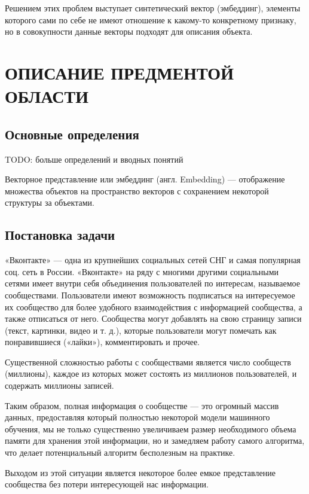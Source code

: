 \documentclass[times,specification,annotation]{itmo-student-thesis}
\begin{document}
Решением этих проблем выступает синтетический вектор (эмбеддинг), элементы
которого сами по себе не имеют отношение к какому-то конкретному признаку, но
в совокупности данные векторы подходят для описания объекта.

\chapter{ОПИСАНИЕ ПРЕДМЕНТОЙ ОБЛАСТИ}

\startrelatedwork

\section{Основные определения}

TODO: больше определений и вводных понятий

Векторное представление или эмбеддинг (англ. Embedding) --- отображение
множества объектов на пространство векторов с сохранением некоторой
структуры за объектами.

\section{Постановка задачи}\label{sec:intro}

«Вконтакте» --- одна из крупнейших социальных сетей СНГ и самая
популярная соц. сеть в России. «Вконтакте» на ряду с многими другими
социальными сетями имеет внутри себя объединения пользователей по интересам,
называемое сообществами. Пользователи имеют возможность подписаться на
интересуемое их сообщество для более удобного взаимодействия с информацией
сообщества, а также отписаться от него. Сообщества могут добавлять на свою
страницу записи (текст, картинки, видео и т. д.), которые пользователи могут
помечать как понравившиеся («лайки»), комментировать и прочее.

Существенной сложностью работы с сообществами является число сообществ (миллионы), каждое из которых может состоять из миллионов пользователей, и содержать миллионы записей.  

Таким образом, полная информация о сообществе --- это огромный массив
данных, предоставляя который полностью некоторой модели машинного обучения,
мы не только существенно увеличиваем размер необходимого объема памяти для хранения этой информации, но и замедляем работу самого алгоритма, что делает потенциальный алгоритм бесполезным на практике.

Выходом из этой ситуации является некоторое более емкое представление сообщества без потери интересующей нас информации.
\end{document}
